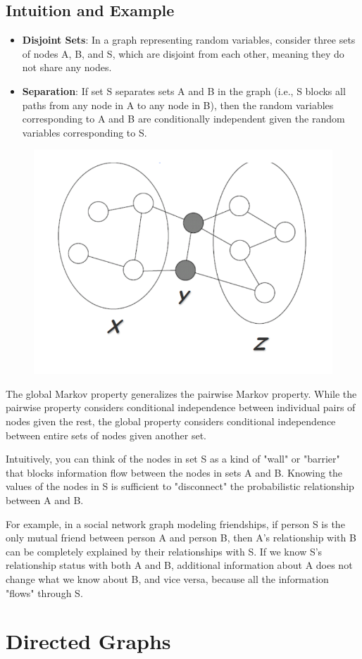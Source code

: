 \documentclass{article}
\begin{document}
\subsection{Intuition and Example}
\begin{itemize}
    \item \textbf{Disjoint Sets}: In a graph representing random variables, consider three sets of nodes A, B, and S, which are disjoint from each other, meaning they do not share any nodes.
    \item \textbf{Separation}: If set S separates sets A and B in the graph (i.e., S blocks all paths from any node in A to any node in B), then the random variables corresponding to A and B are conditionally independent given the random variables corresponding to S.
\end{itemize}

\begin{figure}
    \centering
    \includegraphics[width=0.5\linewidth]{overviews/graphical-models/figures/figure_GMP.png}
\end{figure}

The global Markov property generalizes the pairwise Markov property. While the pairwise property considers conditional independence between individual pairs of nodes given the rest, the global property considers conditional independence between entire sets of nodes given another set.

Intuitively, you can think of the nodes in set S as a kind of "wall" or "barrier" that blocks information flow between the nodes in sets A and B. Knowing the values of the nodes in S is sufficient to "disconnect" the probabilistic relationship between A and B.

For example, in a social network graph modeling friendships, if person S is the only mutual friend between person A and person B, then A's relationship with B can be completely explained by their relationships with S. If we know S's relationship status with both A and B, additional information about A does not change what we know about B, and vice versa, because all the information "flows" through S.



\section{Directed Graphs}
\end{document}
